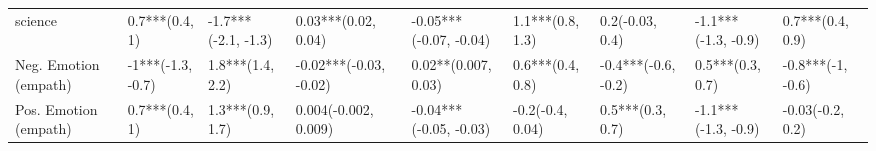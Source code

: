 \begin{tabular}{lllllllll}
science               &       0.7***(0.4, 1) &  -1.7***(-2.1, -1.3) &      0.03***(0.02, 0.04) &  -0.05***(-0.07, -0.04) &     1.1***(0.8, 1.3) &      0.2(-0.03, 0.4) &  -1.1***(-1.3, -0.9) &     0.7***(0.4, 0.9) \\
Neg. Emotion (empath) &    -1***(-1.3, -0.7) &     1.8***(1.4, 2.2) &   -0.02***(-0.03, -0.02) &     0.02**(0.007, 0.03) &     0.6***(0.4, 0.8) &  -0.4***(-0.6, -0.2) &     0.5***(0.3, 0.7) &    -0.8***(-1, -0.6) \\
Pos. Emotion (empath) &       0.7***(0.4, 1) &     1.3***(0.9, 1.7) &     0.004(-0.002, 0.009) &  -0.04***(-0.05, -0.03) &     -0.2(-0.4, 0.04) &     0.5***(0.3, 0.7) &  -1.1***(-1.3, -0.9) &     -0.03(-0.2, 0.2) \\
\bottomrule
\end{tabular}
